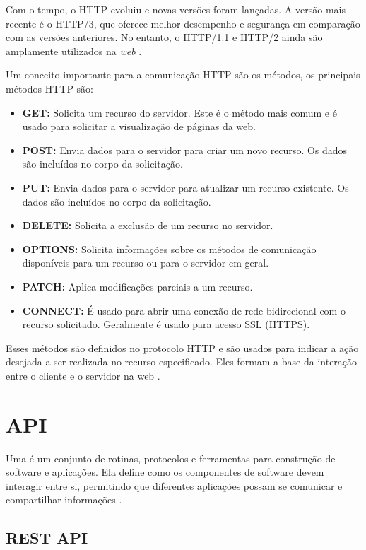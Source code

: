 Com o tempo, o \gls{HTTP} evoluiu e novas versões foram lançadas. A versão mais recente é o \gls{HTTP}/3, que oferece melhor desempenho e segurança em comparação com as versões anteriores. No entanto, o \gls{HTTP}/1.1 e \gls{HTTP}/2 ainda são amplamente utilizados na \textit{web} \cite{HttpIEEE}.

Um conceito importante para a comunicação HTTP são os métodos, os principais métodos HTTP são:

\begin{itemize}
\item \textbf{GET:} Solicita um recurso do servidor. Este é o método mais comum e é usado para solicitar a visualização de páginas da web.
\item \textbf{POST:} Envia dados para o servidor para criar um novo recurso. Os dados são incluídos no corpo da solicitação.
\item \textbf{PUT:} Envia dados para o servidor para atualizar um recurso existente. Os dados são incluídos no corpo da solicitação.
\item \textbf{DELETE:} Solicita a exclusão de um recurso no servidor.
\item \textbf{OPTIONS:} Solicita informações sobre os métodos de comunicação disponíveis para um recurso ou para o servidor em geral.
\item \textbf{PATCH:} Aplica modificações parciais a um recurso.
\item \textbf{CONNECT:} É usado para abrir uma conexão de rede bidirecional com o recurso solicitado. Geralmente é usado para acesso SSL (HTTPS).
\end{itemize}

Esses métodos são definidos no protocolo HTTP e são usados para indicar a ação desejada a ser realizada no recurso especificado. Eles formam a base da interação entre o cliente e o servidor na web \cite{HttpIEEE}.

\section{API}

Uma  é um conjunto de rotinas, protocolos e ferramentas para construção de software e aplicações. Ela define como os componentes de software devem interagir entre si, permitindo que diferentes aplicações possam se comunicar e compartilhar informações \cite{Mulloy2012}.

\subsection{REST API}

